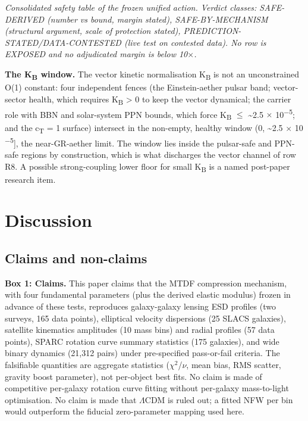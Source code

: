 \documentclass[11pt,a4paper]{article}
\begin{document}
{\footnotesize\itshape Consolidated safety table of the frozen unified action. Verdict classes: SAFE-DERIVED (number vs bound, margin stated), SAFE-BY-MECHANISM (structural argument, scale of protection stated), PREDICTION-STATED/\allowbreak{}DATA-CONTESTED (live test on contested data). No row is EXPOSED and no adjudicated margin is below 10$\times$.}

\textbf{The K\textsubscript{B} window.} The vector kinetic normalisation K\textsubscript{B} is not an unconstrained O(1) constant: four independent fences (the Einstein-aether pulsar band; vector-sector health, which requires K\textsubscript{B} > 0 to keep the vector dynamical; the carrier role with BBN and solar-system PPN bounds, which force K\textsubscript{B} $\leq$ \~{}2.5 $\times$ 10\textsuperscript{$-$5}; and the c\textsubscript{T} = 1 surface) intersect in the non-empty, healthy window (0, \~{}2.5 $\times$ 10\textsuperscript{$-$5}], the near-GR-aether limit. The window lies inside the pulsar-safe and PPN-safe regions by construction, which is what discharges the vector channel of row R8. A possible strong-coupling lower floor for small K\textsubscript{B} is a named post-paper research item.

\section{Discussion}
\label{sec:discussion}

\subsection{Claims and non-claims}
\begin{mdframed}[linecolor=accent,linewidth=0.5pt,backgroundcolor=callout-bg,leftline=true,rightline=true,topline=true,bottomline=true,innerleftmargin=8pt,innerrightmargin=8pt,innertopmargin=6pt,innerbottommargin=6pt]
\textbf{Box 1: Claims.} This paper claims that the MTDF compression mechanism, with four fundamental parameters (plus the derived elastic modulus) frozen in advance of these tests, reproduces galaxy-galaxy lensing ESD profiles (two surveys, 165 data points), elliptical velocity dispersions (25 SLACS galaxies), satellite kinematics amplitudes (10 mass bins) and radial profiles (57 data points), SPARC rotation curve summary statistics (175 galaxies), and wide binary dynamics (21,312 pairs) under pre-specified pass-or-fail criteria. The falsifiable quantities are aggregate statistics ($\chi$$^{2}$/$\nu$, mean bias, RMS scatter, gravity boost parameter), not per-object best fits. No claim is made of competitive per-galaxy rotation curve fitting without per-galaxy mass-to-light optimisation. No claim is made that $\Lambda$CDM is ruled out; a fitted NFW per bin would outperform the fiducial zero-parameter mapping used here.
\end{mdframed}
\end{document}
